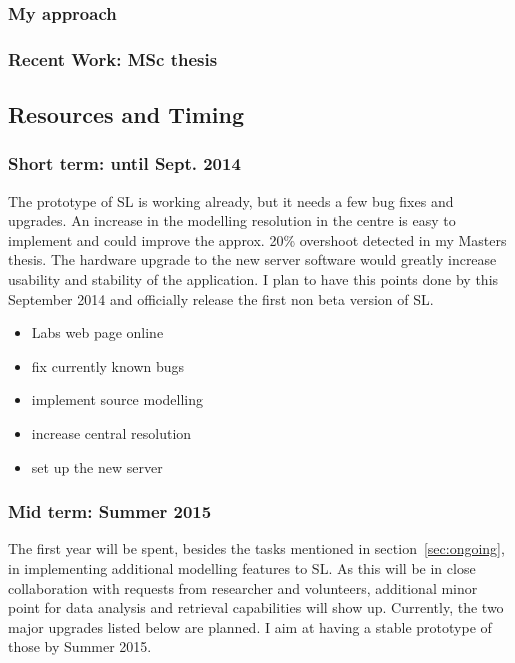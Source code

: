 \documentclass[11pt]{article}
\begin{document}
\subsubsection{My approach}

\subsubsection{Recent Work: MSc thesis}




\subsection{Resources and Timing}



\subsubsection{Short term: until Sept. 2014}
The prototype of SL is working already, but it needs a few bug fixes and upgrades.
An increase in the modelling resolution in the centre is easy to implement and could improve the approx. 20\% overshoot detected in my Masters thesis.
The hardware upgrade to the new server software would greatly increase usability and stability of the application.
I plan to have this points done by this September 2014 and officially release the first non beta version of SL.

\begin{itemize}
	\item Labs web page online
  \item fix currently known bugs
  \item implement source modelling
  \item increase central resolution
  \item set up the new server
\end{itemize}


\subsubsection{Mid term: Summer 2015}

The first year will be spent, besides the tasks mentioned in section~\ref{sec:ongoing}, in implementing additional modelling features to SL.
As this will be in close collaboration with requests from researcher and volunteers, additional minor point for data analysis and retrieval capabilities will show up.
Currently, the two major upgrades listed below are planned. I aim at having a stable prototype of those by Summer 2015.
\end{document}
